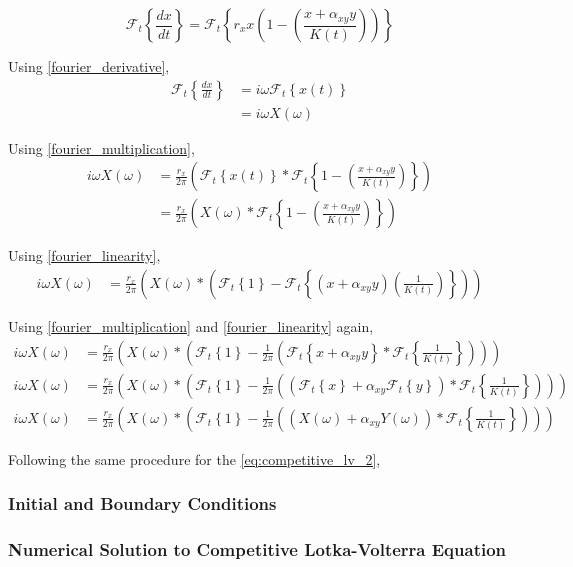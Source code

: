 \begin{equation}
    \mathcal{F}_t \left\{ \frac{dx}{dt} \right\} = \mathcal{F}_t \left\{ r_x x \left(1 - \left(\frac{x + \alpha_{xy} y}{K(t)}\right)\right) \right\}
\end{equation}

\noindent
Using \cref{fourier_derivative},
\begin{align}
    \mathcal{F}_t \left\{ \frac{dx}{dt} \right\} &= i \omega \mathcal{F}_t \left\{ x(t) \right\} \\
    &= i \omega X(\omega)
\end{align}

\noindent
Using \cref{fourier_multiplication},
\begin{align}
    i \omega X(\omega) &= \frac{r_x}{2 \pi} \left( \mathcal{F}_t \left\{ x(t) \right\} * \mathcal{F}_t \left\{ 1 - \left(\frac{x + \alpha_{xy} y}{K(t)}\right) \right\} \right) \\
    &= \frac{r_x}{2 \pi} \left( X(\omega) * \mathcal{F}_t \left\{ 1 - \left(\frac{x + \alpha_{xy} y}{K(t)}\right) \right\} \right)
\end{align}

\noindent
Using \cref{fourier_linearity},
\begin{align}
    i \omega X(\omega) &= \frac{r_x}{2 \pi} \left( X(\omega) * \left( \mathcal{F}_t \left\{ 1 \right\} -  \mathcal{F}_t \left\{ \left(x + \alpha_{xy} y\right) \left( \frac{1}{K(t)} \right) \right\} \right) \right)
\end{align}

\noindent
Using \cref{fourier_multiplication} and \cref{fourier_linearity} again,
\begin{align}
    i \omega X(\omega) &= \frac{r_x}{2 \pi} \left( X(\omega) * \left( \mathcal{F}_t \left\{ 1 \right\} - \frac{1}{2 \pi} \left( \mathcal{F}_t \left\{ x + \alpha_{xy} y \right\} * \mathcal{F}_t \left\{ \frac{1}{K(t)} \right\} \right) \right) \right) \\
    i \omega X(\omega) &= \frac{r_x}{2 \pi} \left( X(\omega) * \left( \mathcal{F}_t \left\{ 1 \right\} - \frac{1}{2 \pi}  \left( \left( \mathcal{F}_t \left\{ x \right\} + \alpha_{xy} \mathcal{F}_t \left\{ y \right\} \right) * \mathcal{F}_t \left\{ \frac{1}{K(t)} \right\} \right) \right) \right) \\
    i \omega X(\omega) &= \frac{r_x}{2 \pi} \left( X(\omega) * \left( \mathcal{F}_t \left\{ 1 \right\} - \frac{1}{2 \pi}  \left( \left( X(\omega) + \alpha_{xy} Y(\omega) \right) * \mathcal{F}_t \left\{ \frac{1}{K(t)} \right\} \right) \right) \right)
\end{align}

\noindent
Following the same procedure for the \cref{eq:competitive_lv_2},

\subsubsection{Initial and Boundary Conditions}

\subsubsection{Numerical Solution to Competitive Lotka-Volterra Equation}